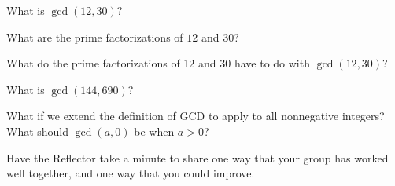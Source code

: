 \documentclass{tufte-handout}
\begin{document}
\begin{questions}
\item What is $\gcd(12,30)$?
\item What are the prime factorizations of $12$ and $30$?
\item What do the prime factorizations of $12$ and $30$ have to do
  with $\gcd(12,30)$?
\item What is $\gcd(144, 690)$?
\item What if we extend the definition of GCD to apply to all
  nonnegative integers?  What should $\gcd(a,0)$ be when $a > 0$?
\item Have the Reflector take a minute to share one way that your
  group has worked well together, and one way that you could improve.
\end{questions}

\pause
\end{document}
